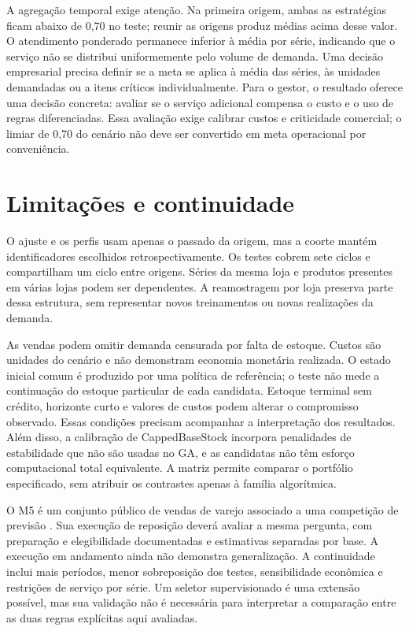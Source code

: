 \documentclass[preprint,12pt]{elsarticle}
\begin{document}
A agregação temporal exige atenção. Na primeira origem, ambas as estratégias ficam abaixo de 0,70 no teste; reunir as origens produz médias acima desse valor. O atendimento ponderado permanece inferior à média por série, indicando que o serviço não se distribui uniformemente pelo volume de demanda. Uma decisão empresarial precisa definir se a meta se aplica à média das séries, às unidades demandadas ou a itens críticos individualmente. Para o gestor, o resultado oferece uma decisão concreta: avaliar se o serviço adicional compensa o custo e o uso de regras diferenciadas. Essa avaliação exige calibrar custos e criticidade comercial; o limiar de 0,70 do cenário não deve ser convertido em meta operacional por conveniência.

\section{Limitações e continuidade}
O ajuste e os perfis usam apenas o passado da origem, mas a coorte mantém identificadores escolhidos retrospectivamente. Os testes cobrem sete ciclos e compartilham um ciclo entre origens. Séries da mesma loja e produtos presentes em várias lojas podem ser dependentes. A reamostragem por loja preserva parte dessa estrutura, sem representar novos treinamentos ou novas realizações da demanda.

As vendas podem omitir demanda censurada por falta de estoque. Custos são unidades do cenário e não demonstram economia monetária realizada. O estado inicial comum é produzido por uma política de referência; o teste não mede a continuação do estoque particular de cada candidata. Estoque terminal sem crédito, horizonte curto e valores de custos podem alterar o compromisso observado. Essas condições precisam acompanhar a interpretação dos resultados. Além disso, a calibração de CappedBaseStock incorpora penalidades de estabilidade que não são usadas no GA, e as candidatas não têm esforço computacional total equivalente. A matriz permite comparar o portfólio especificado, sem atribuir os contrastes apenas à família algorítmica.

O M5 é um conjunto público de vendas de varejo associado a uma competição de previsão \cite{Makridakis2022M5Accuracy}. Sua execução de reposição deverá avaliar a mesma pergunta, com preparação e elegibilidade documentadas e estimativas separadas por base. A execução em andamento ainda não demonstra generalização. A continuidade inclui mais períodos, menor sobreposição dos testes, sensibilidade econômica e restrições de serviço por série. Um seletor supervisionado é uma extensão possível, mas sua validação não é necessária para interpretar a comparação entre as duas regras explícitas aqui avaliadas.
\end{document}
